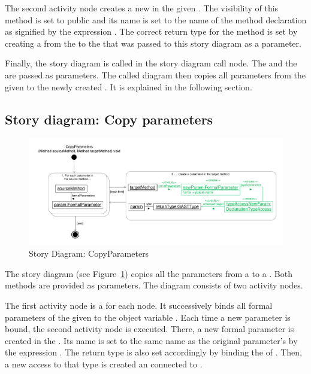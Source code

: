 The second activity node creates a new  in the given . The visibility of this method is set to public and its name is set to the name of the method declaration as signified by the expression . The correct return type for the method is set by creating a  from the  to the  that was passed to this story diagram as a parameter.

Finally, the story diagram  is called in the story diagram call node. The  and the  are passed as parameters. The called diagram then copies all parameters from the given  to the newly created . It is explained in the following section.

\subsection{Story diagram: Copy parameters} \label{sec:SDCopyParameters}

\begin{figure}[hbtp]
\centering
\includegraphics[width=0.9\linewidth]{./figures/SDCopyParameters}
\caption{Story Diagram: CopyParameters}
\label{fig:SDCopyParameters}
\end{figure}

The story diagram  (see Figure~\ref{fig:SDCopyParameters}) copies all the parameters from a  to a . Both methods are provided as parameters. The diagram consists of two activity nodes.

The first activity node is a for each node. It successively binds all formal parameters of the given  to the object variable . Each time a new parameter is bound, the second activity node is executed. There, a new formal parameter  is created in the . Its name is set to the same name as the original parameter's by the expression . The return type is also set accordingly by binding the  of . Then, a new access to that type is created an connected to .
